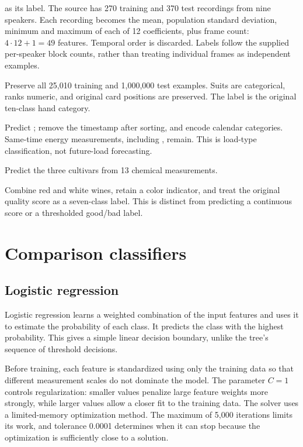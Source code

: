 \documentclass[11pt,letterpaper]{article}
\newcommand{\code}[1]{\texttt{\detokenize{#1}}}
\begin{document}
\begin{description}
as its label. The source has 270 training and 370 test recordings from nine
speakers. Each recording becomes the mean, population standard
deviation, minimum and maximum of each of 12 coefficients, plus frame count:
$4\cdot12+1=49$ features. Temporal order is discarded. Labels follow the supplied
per-speaker block counts, rather than treating individual frames as independent examples.
\item[Benchmark 7: Poker Hand.] Preserve all 25,010 training and 1,000,000 test examples.
Suits are categorical, ranks numeric, and original card positions are preserved.
The label is the original ten-class hand category.
\item[Benchmark 8: Steel Industry.] Predict \code{Load_Type}; remove the timestamp after
sorting, and encode calendar categories. Same-time energy measurements, including
\code{Usage_kWh}, remain. This is load-type classification, not future-load forecasting.
\item[Benchmark 9: Wine.] Predict the three cultivars from 13 chemical measurements.
\item[Benchmark 10: Wine Quality.] Combine red and white wines, retain a color indicator,
and treat the original quality score as a seven-class label. This is distinct
from predicting a continuous score or a thresholded good/bad label.
\end{description}

\section{Comparison classifiers}
\subsection{Logistic regression}
Logistic regression learns a weighted combination of the input features and
uses it to estimate the probability of each class. It predicts the class with
the highest probability. This gives a simple linear decision boundary, unlike
the tree's sequence of threshold decisions.

Before training, each feature is standardized using only the training data so
that different measurement scales do not dominate the model. The parameter
$C=1$ controls regularization: smaller values penalize large feature weights
more strongly, while larger values allow a closer fit to the training data.
The solver uses a limited-memory optimization method. The maximum of 5,000
iterations limits its work, and tolerance 0.0001 determines when it can stop
because the optimization is sufficiently close to a solution.
\end{document}
